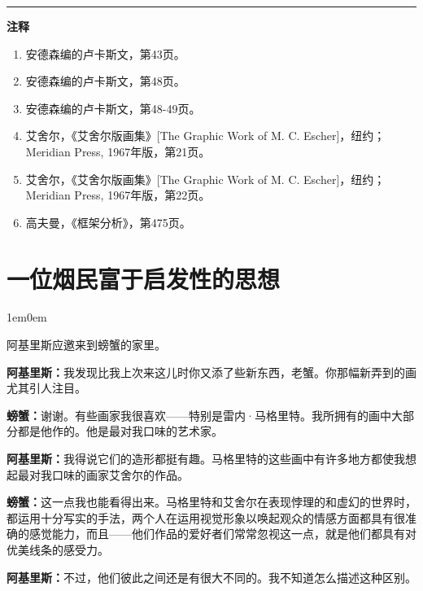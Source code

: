 \documentclass[
  12pt,
  twoside,
  openright,
  oldfontcommands,
]{memoir}
\newcommand{\dialogname}[1]{{\heifamily\bfseries #1}}
\newenvironment{dialogguide}{%
  \begin{adjustwidth}{1em}{0em}\kaitifamily\itshape\small%
}{%
  \end{adjustwidth}%
}
\begin{document}
{\footnotesize\setlength{\parindent}{0pt}%
\noindent\textcolor{rulegray}{\rule{0.35\linewidth}{0.3pt}}\par\vspace{2pt}
\noindent\textbf{注释}\par\vspace{3pt}
\begin{enumerate}
\label{fn:Chapter15-1}{}
\item 安德森编的卢卡斯文，第43页。
\label{fn:Chapter15-2}{}
\item 安德森编的卢卡斯文，第48页。
\label{fn:Chapter15-3}{}
\item 安德森编的卢卡斯文，第48-49页。
\label{fn:Chapter15-4}{}
\item 艾舍尔，《艾舍尔版画集》[The Graphic Work of M. C. Escher]，纽约；Meridian Press, 1967年版，第21页。
\label{fn:Chapter15-5}{}
\item 艾舍尔，《艾舍尔版画集》[The Graphic Work of M. C. Escher]，纽约；Meridian Press, 1967年版，第22页。
\label{fn:Chapter15-6}{}
\item 高夫曼，《框架分析》，第475页。
\end{enumerate}
}

\label{Dialog16.xhtml}{}

\chapter*{一位烟民富于启发性的思想}

\begin{dialogguide}
阿基里斯应邀来到螃蟹的家里。
\end{dialogguide}

\dialogname{阿基里斯：}我发现比我上次来这儿时你又添了些新东西，老蟹。你那幅新弄到的画尤其引人注目。

\dialogname{螃蟹：}谢谢。有些画家我很喜欢------特别是雷内·马格里特。我所拥有的画中大部分都是他作的。他是最对我口味的艺术家。

\dialogname{阿基里斯：}我得说它们的造形都挺有趣。马格里特的这些画中有许多地方都使我想起最对我口味的画家艾舍尔的作品。

\dialogname{螃蟹：}这一点我也能看得出来。马格里特和艾舍尔在表现悖理的和虚幻的世界时，都运用十分写实的手法，两个人在运用视觉形象以唤起观众的情感方面都具有很准确的感觉能力，而且------他们作品的爱好者们常常忽视这一点，就是他们都具有对优美线条的感受力。

\dialogname{阿基里斯：}不过，他们彼此之间还是有很大不同的。我不知道怎么描述这种区别。
\end{document}
